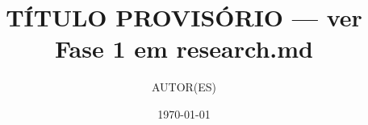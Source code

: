 \documentclass[11pt]{article}
\title{TÍTULO PROVISÓRIO — ver Fase 1 em research.md}
\author{AUTOR(ES)}
\date{\today}
\begin{document}
\maketitle

\begin{abstract}
\end{abstract}



% 
\end{document}
